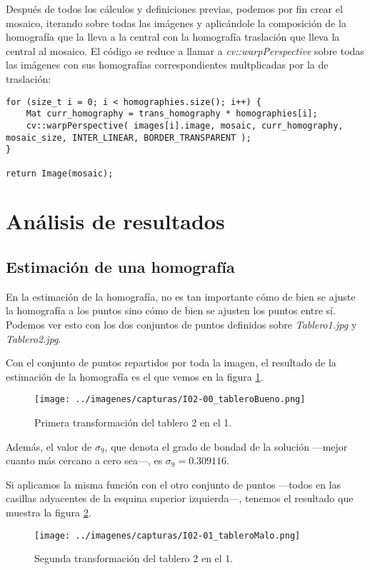 \documentclass[a4paper, 11pt]{article}
\theoremstyle{definition}
\theoremstyle{theorem}
\begin{document}
    Después de todos los cálculos y definiciones previas, podemos por fin crear el mosaico, iterando sobre todas las imágenes y aplicándole la composición de la homografía que la lleva a la central con la homografía traslación que lleva la central al mosaico. El código se reduce a llamar a \emph{cv::warpPerspective} sobre todas las imágenes con sus homografías correspondientes multplicadas por la de traslación:
    \begin{lstlisting}
for (size_t i = 0; i < homographies.size(); i++) {
    Mat curr_homography = trans_homography * homographies[i];
    cv::warpPerspective( images[i].image, mosaic, curr_homography, mosaic_size, INTER_LINEAR, BORDER_TRANSPARENT );
}

return Image(mosaic);
    \end{lstlisting}

    \newpage
    \section{Análisis de resultados}
    \subsection{Estimación de una homografía}
    En la estimación de la homografía, no es tan importante cómo de bien se ajuste la homografía a los puntos sino cómo de bien se ajusten los puntos entre sí. Podemos ver esto con los dos conjuntos de puntos definidos sobre \emph{Tablero1.jpg} y \emph{Tablero2.jpg}.

    Con el conjunto de puntos repartidos por toda la imagen, el resultado de la estimación de la homografía es el que vemos en la figura \ref{tablero1}.

    \begin{figure}[ht!]
        \centering
        \texttt{[image: ../imagenes/capturas/I02-00\_tableroBueno.png]}
        \caption{Primera transformación del tablero 2 en el 1. \label{tablero1}}
    \end{figure}

    Además, el valor de $\sigma_9$, que denota el grado de bondad de la solución ---mejor cuanto más cercano a cero sea---, es $\sigma_9 = 0.309116$.

    Si aplicamos la misma función con el otro conjunto de puntos ---todos en las casillas adyacentes de la esquina superior izquierda---, tenemos el resultado que muestra la figura \ref{tablero2}.

    \begin{figure}[ht!]
        \centering
        \texttt{[image: ../imagenes/capturas/I02-01\_tableroMalo.png]}
        \caption{Segunda transformación del tablero 2 en el 1. \label{tablero2}}
    \end{figure}
\end{document}
